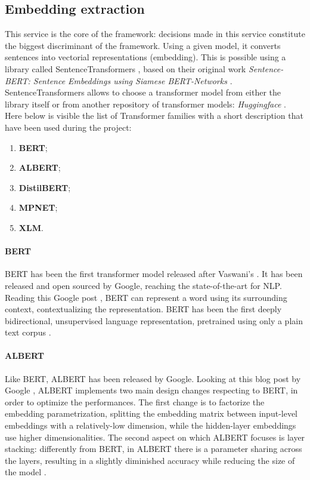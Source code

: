 \documentclass[\main/main.tex]{subfiles}
\begin{document}
\subsection{Embedding extraction}
This service is the core of the framework: decisions made in this service constitute the biggest discriminant of the framework. Using a given model, it converts sentences into vectorial representations (embedding). This is possible using a library called SentenceTransformers \cite{sbert}, based on their original work \emph{Sentence-BERT: Sentence Embeddings using Siamese BERT-Networks} \cite{reimers2019sentencebert}. SentenceTransformers allows to choose a transformer model from either the library itself or from another repository of transformer models: \emph{Huggingface} \cite{huggingface}. Here below is visible the list of Transformer families with a short description that have been used during the project:
\begin{enumerate}
    \item \textbf{BERT};
    \item \textbf{ALBERT};
    \item \textbf{DistilBERT};
    \item \textbf{MPNET};
    \item \textbf{XLM}.
\end{enumerate} 
\paragraph{BERT}
BERT has been the first transformer model released after Vaswani's \cite{vaswani2017attention}. It has been released and open sourced by Google, reaching the state-of-the-art for NLP. Reading this Google post \cite{bert_blog_post}, BERT can represent a word using its surrounding context, contextualizing the representation. BERT has been the first deeply bidirectional, unsupervised language representation, pretrained using only a plain text corpus \cite{DBLP:journals/corr/abs-1810-04805}.
\paragraph{ALBERT}
Like BERT, ALBERT has been released by Google. Looking at this blog post by Google \cite{albert_blog_post}, ALBERT implements two main design changes respecting to BERT, in order to optimize the performances. The first change is to factorize the embedding parametrization, splitting the embedding matrix between input-level embeddings with a relatively-low dimension, while the hidden-layer embeddings use higher dimensionalities. The second aspect on which ALBERT focuses is layer stacking: differently from BERT, in ALBERT there is a parameter sharing across the layers, resulting in a slightly diminished accuracy while reducing the size of the model \cite{DBLP:journals/corr/abs-1909-11942}.
\end{document}
